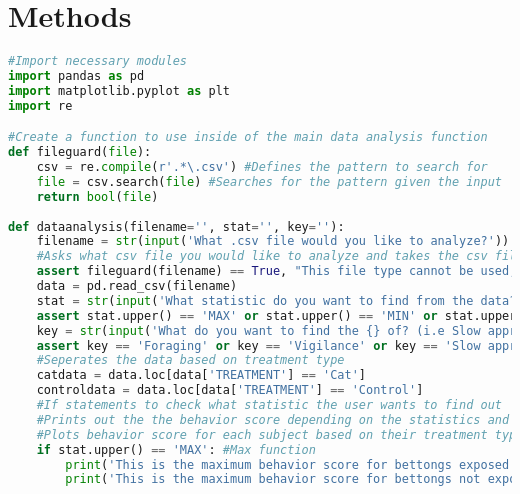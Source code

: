 \documentclass[letterpaper]{article}
\begin{document}
\section*{Methods}
\begin{lstlisting}[language = Python]
#Import necessary modules
import pandas as pd
import matplotlib.pyplot as plt
import re

#Create a function to use inside of the main data analysis function
def fileguard(file):  
    csv = re.compile(r'.*\.csv') #Defines the pattern to search for
    file = csv.search(file) #Searches for the pattern given the input 
    return bool(file)
   
def dataanalysis(filename='', stat='', key=''):    
    filename = str(input('What .csv file would you like to analyze?'))
    #Asks what csv file you would like to analyze and takes the csv file and reads it, and asks the user for inputs for what they want to find and for what category. 
    assert fileguard(filename) == True, "This file type cannot be used, please use a .csv file type" #Checks if the input for the file is a .csv file, if not it will propse an assertion error saying to input a .csv file
    data = pd.read_csv(filename)
    stat = str(input('What statistic do you want to find from the data? (i.e. Max, Min, Avg, Std) '))
    assert stat.upper() == 'MAX' or stat.upper() == 'MIN' or stat.upper() == 'AVG' or stat.upper() == 'STD', 'Please choose one of the example statistical analysis' #Checks if the input for the type of statistic is one of the options avaliable, if not will propose an assertion error
    key = str(input('What do you want to find the {} of? (i.e Slow approach, Vigilance, Foraging)'.format(stat)))
    assert key == 'Foraging' or key == 'Vigilance' or key == 'Slow approach', "Please choose from one of the catagories shown above" #Checks if the input for the catagory is one of the columns in the dataset, if not propse an assertion error.  
    #Seperates the data based on treatment type
    catdata = data.loc[data['TREATMENT'] == 'Cat']
    controldata = data.loc[data['TREATMENT'] == 'Control']
    #If statements to check what statistic the user wants to find out
    #Prints out the the behavior score depending on the statistics and rounds it to 3 sigfig
    #Plots behavior score for each subject based on their treatment type using matplotlib
    if stat.upper() == 'MAX': #Max function
        print('This is the maximum behavior score for bettongs exposed to cats:',round(catdata[key].max(), 3))
        print('This is the maximum behavior score for bettongs not exposed to cats:',round(controldata[key].max(), 3))

\end{lstlisting}
\end{document}
